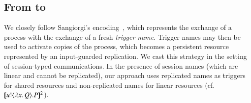 \documentclass[runningheads]{llncs}
\begin{document}
{\subsection{From \HOp to \sessp}
\label{subsec:HOp_to_sessp}
We closely follow Sangiorgi's encoding~\cite{San92,SaWabook}, which represents 
the exchange of a process with the exchange of a fresh \emph{trigger name}. 
Trigger names may then be used to activate copies of the process, which becomes a persistent resource represented by an input-guarded replication.
We cast this strategy in the setting of session-typed communications. 
In the presence of session names (which are linear  and cannot be replicated),
our
approach %
 uses replicated names
as triggers for shared resources and non-replicated names
for linear resources (cf. $[\!\![u ! \langle \lambda x.\,Q \rangle . P]\!\!]^2$).


}
\end{document}
